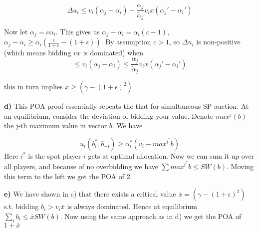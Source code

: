 $$
\Delta u_i \leq v_i(\alpha_j-\alpha_i) - \frac{\alpha_j}{\tilde \alpha_j}v_ix( \alpha_j'- \alpha_i')
$$

Now let $\alpha_j=c \alpha_i$. This gives us $\alpha_j - \alpha_i =\alpha_i(c-1)$, $\alpha_j - \alpha_i \geq \alpha_i(\frac{c}{1+\epsilon} - (1+\epsilon))$. By assumption $c>1$, so $\Delta u_i$ is non-positive (which means bidding $vx$ is dominated) when $$ \leq v_i(\alpha_j-\alpha_i) \leq \frac{\alpha_j}{\tilde \alpha_j}v_ix( \alpha_j'- \alpha_i')$$

this in turn implies $x\geq (\gamma-(1+\epsilon)^2)$

\textbf{d)} This POA proof essentially repeats the that for simultaneous SP auction. At an equilibrium, consider the deviation of bidding your value.  Denote $max^j(b)$ the j-th maximum value in vector $b$. We have

$$
u_i(b_i^*,b_{-i})\geq \alpha_i^*(v_i - max^{i^*}b)
$$
Here $i^*$ is the spot player $i$ gets at optimal allocation. Now we can sum it up over all players, and because of no overbidding we have $\sum max^{i^*}b\leq SW(b)$. Moving this term to the left we get the POA of 2.

\textbf{e)} We have shown in c) that there exists a critical value $\bar x=(\gamma-(1+\epsilon)^2)$ s.t. bidding $b_i>v_i \bar x$ is always dominated. Hence at equilibrium $\sum_i b_i \leq \bar x SW(b)$. Now using the same approach as in d) we get the POA of $1+\bar x$

